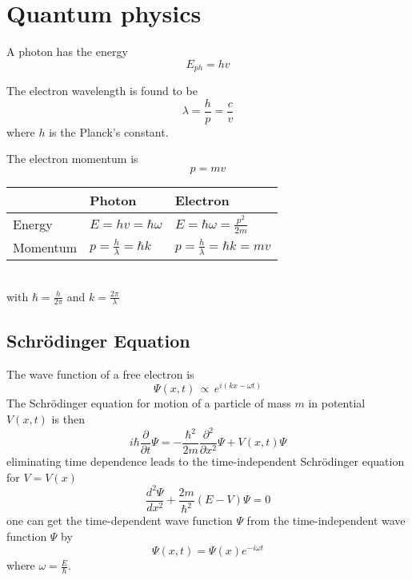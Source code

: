 \section{Quantum physics}

A photon has the energy
\begin{equation}
    E_{ph} = h v
\end{equation}

The electron wavelength is found to be
\begin{equation}
    \lambda = \frac{h}{p} = \frac{c}{v}
\end{equation}
where $h$ is the Planck's constant.

The electron momentum is 
\begin{equation}
    p = m v
\end{equation}

\begin{table}[ht!]
    \centering
    \begin{tabular}{lll}
        & Photon & Electron \\ \toprule
        Energy & $E = h v = \hbar \omega$ & $E = \hbar \omega = \frac{p^2}{2m}$ \\
        Momentum & $p = \frac{h}{\lambda} = \hbar k$ & $p = \frac{h}{\lambda} = \hbar k = m v$ \\ \bottomrule
    \end{tabular} \\
     with $\hbar = \frac{h}{2\pi}$ and $k = \frac{2\pi}{\lambda}$
\end{table}

\subsection{Schrödinger Equation}
The wave function of a free electron is
\begin{equation}
    \Psi(x,t) \,\propto\, e^{i (kx-\omega t)}
\end{equation}
The Schrödinger equation for motion of a particle of mass $m$ in potential $V(x,t)$ is then
\begin{equation}
    i \hbar \frac{\partial}{\partial t} \Psi = - \frac{\hbar^2}{2m}\frac{\partial^2}{\partial x^2} \Psi + V(x,t) \Psi
\end{equation}
eliminating time dependence leads to the time-independent Schrödinger equation for $V=V(x)$
\begin{equation}
    \frac{d^2 \varPsi}{d x^2} + \frac{2m}{\hbar^2}(E-V) \varPsi = 0
\end{equation}
one can get the time-dependent wave function $\Psi$ from the time-independent wave function $\varPsi$ by
\begin{equation}
    \Psi(x,t) = \varPsi(x) e^{-i \omega t}
\end{equation}
where $\omega = \frac{E}{\hbar}$.

